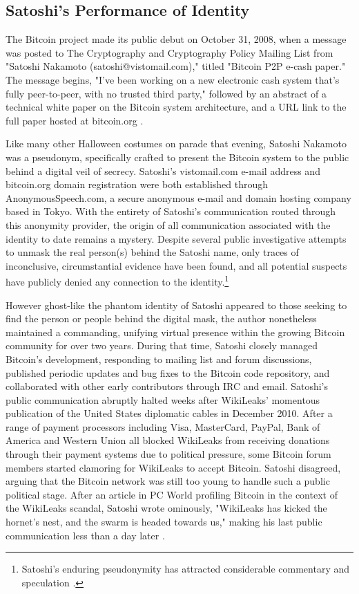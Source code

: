 \subsection*{Satoshi's Performance of Identity}
The Bitcoin project made its public debut on October 31, 2008, when a message was posted to The Cryptography and Cryptography Policy Mailing List from "Satoshi Nakamoto (satoshi@vistomail.com)," titled "Bitcoin P2P e-cash paper." The message begins, "I've been working on a new electronic cash system that's fully peer-to-peer, with no trusted third party," followed by an abstract of a technical white paper on the Bitcoin system architecture, and a URL link to the full paper hosted at bitcoin.org \autocite{NakamotoEmail}.

Like many other Halloween costumes on parade that evening, Satoshi Nakamoto was a pseudonym, specifically crafted to present the Bitcoin system to the public behind a digital veil of secrecy. Satoshi's vistomail.com e-mail address and bitcoin.org domain registration were both established through AnonymousSpeech.com, a secure anonymous e-mail and domain hosting company based in Tokyo. With the entirety of Satoshi's communication routed through this anonymity provider, the origin of all communication associated with the identity to date remains a mystery. Despite several public investigative attempts to unmask the real person(s) behind the Satoshi name, only traces of inconclusive, circumstantial evidence have been found, and all potential suspects have publicly denied any connection to the identity.\footnote{
  Satoshi's enduring pseudonymity has attracted considerable commentary and speculation \autocites{Davis11}{Penenberg11}{LikeInAMirror13}{Peterson14}{Goodman14}.
}

However ghost-like the phantom identity of Satoshi appeared to those seeking to find the person or people behind the digital mask, the author nonetheless maintained a commanding, unifying virtual presence within the growing Bitcoin community for over two years. During that time, Satoshi closely managed Bitcoin's development, responding to mailing list and forum discussions, published periodic updates and bug fixes to the Bitcoin code repository, and collaborated with other early contributors through IRC and email. Satoshi's public communication abruptly halted weeks after WikiLeaks' momentous publication of the United States diplomatic cables in December 2010. After a range of payment processors including Visa, MasterCard, PayPal, Bank of America and Western Union all blocked WikiLeaks from receiving donations through their payment systems due to political pressure, some Bitcoin forum members started clamoring for WikiLeaks to accept Bitcoin. Satoshi disagreed, arguing that the Bitcoin network was still too young to handle such a public political stage. After an article in PC World profiling Bitcoin in the context of the WikiLeaks scandal, Satoshi wrote ominously, "WikiLeaks has kicked the hornet's nest, and the swarm is headed towards us," making his last public communication less than a day later \autocites{Nakamoto10}[see also][]{Wallace11}.

